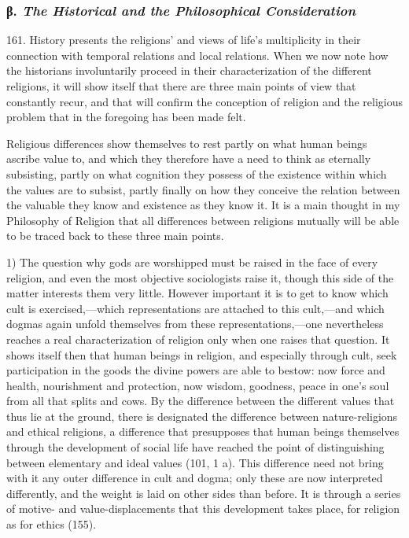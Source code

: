 \documentclass[12pt,a4paper]{book}
\newcommand{\opage}[1]{\marginnote{\footnotesize\textit{[#1]}}}
\begin{document}
\subsubsection*{β. \emph{The Historical and the Philosophical Consideration}}

161. History presents the religions' and views of life's multiplicity in their connection with
temporal relations and local relations. When we now note how the historians involuntarily proceed
in their characterization of the different religions, it will show itself that there are three main
points of view that constantly recur, and that will confirm the conception of religion and the
religious problem that in the foregoing has been made felt.

Religious differences show themselves to rest partly on what human beings ascribe value to, and
which they therefore have a need to think as eternally subsisting, partly on what cognition they
possess of the existence within which the values are to subsist, partly finally on how they conceive
the relation between the valuable they know and existence as they know it. It is a main thought in my
Philosophy of Religion that all differences between religions mutually will be able to be traced back
to these three main points.

1) The question why gods are worshipped must be raised in the face of every religion, and even the
most objective sociologists raise it, though this side of the matter interests \opage{386}them very little.
However important it is to get to know which cult is exercised,---which representations are attached
to this cult,---and which dogmas again unfold themselves from these representations,---one nevertheless
reaches a real characterization of religion only when one raises that question. It shows itself then
that human beings in religion, and especially through cult, seek participation in the goods the divine
powers are able to bestow: now force and health, nourishment and protection, now wisdom, goodness,
peace in one's soul from all that splits and cows. By the difference between the different values that
thus lie at the ground, there is designated the difference between nature-religions and ethical
religions, a difference that presupposes that human beings themselves through the development of social
life have reached the point of distinguishing between elementary and ideal values (101, 1 a). This
difference need not bring with it any outer difference in cult and dogma; only these are now interpreted
differently, and the weight is laid on other sides than before. It is through a series of motive- and
value-displacements that this development takes place, for religion as for ethics (155).
\end{document}
